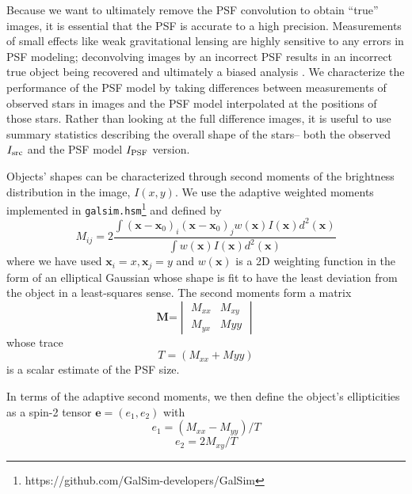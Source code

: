 \documentclass[SE,lsstdraft,authoryear,toc]{lsstdoc}
\begin{document}
Because we want to ultimately remove the PSF convolution to obtain ``true'' images, it is essential that the PSF is accurate to a high precision.
Measurements of small effects like weak gravitational lensing are highly sensitive to any errors in PSF modeling; deconvolving images by an incorrect PSF results in an incorrect true object being recovered and ultimately a biased analysis \citep{2023OJAp....6E...5M}.
We characterize the performance of the PSF model by taking differences between measurements of observed stars in images and the PSF model interpolated at the positions of those stars.
Rather than looking at the full difference images, it is useful to use summary statistics describing the overall shape of the stars-- both the observed $I_{\rm src}$ and the PSF model $I_{\rm PSF}$ version.

Objects' shapes can be characterized through second moments of the brightness distribution in the image, $I(x,y)$.
We use the adaptive weighted moments implemented in \texttt{galsim.hsm}\footnote{https://github.com/GalSim-developers/GalSim} \citep{2003MNRAS.343..459H} \citep{2005MNRAS.361.1287M} and defined by
\begin{equation}
    M_{ij} = 2 \frac{\int(\textbf{x}-\textbf{x}_0)_i (\textbf{x}-\textbf{x}_0)_jw(\textbf{x})I(\textbf{x})d^2(\textbf{x})}{\int w(\textbf{x})I(\textbf{x})d^2(\textbf{x})}
\end{equation}
where we have used $\textbf{x}_i=x, \textbf{x}_j=y$ and $w(\textbf{x})$ is a 2D weighting function in the form of an elliptical Gaussian whose shape is fit to have the least deviation from the object in a least-squares sense. 
The second moments form a matrix
\begin{equation}
\textbf{M=}
\begin{vmatrix}
    M_{xx} & M_{xy}\\
    M_{yx} & M{yy}
\end{vmatrix}
\end{equation}
whose trace
\begin{equation}
    T=(M_{xx}+M{yy})
\end{equation}
is a scalar estimate of the PSF size. 

In terms of the adaptive second moments, we then define the object's ellipticities as a spin-2 tensor $\textbf{e}=(e_1, e_2)$ with
\begin{equation}
    e_1 = (M_{xx}-M_{yy})/T
\end{equation}
\begin{equation}
    e_2 = 2M_{xy}/T
\end{equation}
\end{document}
